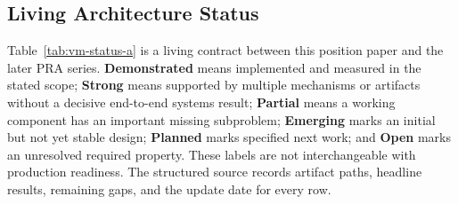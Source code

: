 \documentclass[11pt]{article}
\begin{document}
\iffalse
\subsection{Living Architecture Status}

Table~\ref{tab:vm-status-a} is a living contract between this position paper and the later PRA
series.  \textbf{Demonstrated} means implemented and measured in the stated scope;
\textbf{Strong} means supported by multiple mechanisms or artifacts without a decisive
end-to-end systems result; \textbf{Partial} means a working component has an important missing
subproblem; \textbf{Emerging} marks an initial but not yet stable design; \textbf{Planned} marks
specified next work; and \textbf{Open} marks an unresolved required property.  These labels are
not interchangeable with production readiness.  The structured source
 records artifact paths, headline results, remaining gaps, and
the update date for every row.
\end{document}
